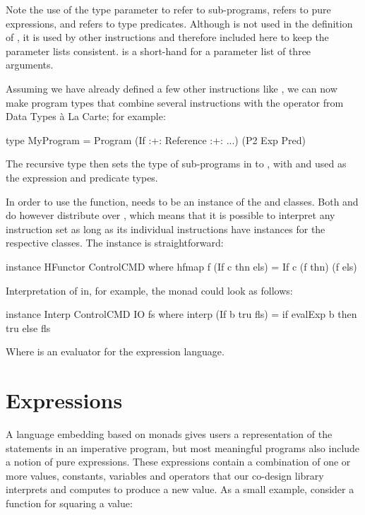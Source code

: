 \documentclass[../main.tex]{subfiles}
\begin{document}
\noindent Note the use of the type parameter  to refer to sub-programs,  refers to pure expressions, and  refers to type predicates. Although  is not used in the definition of , it is used by other instructions and therefore included here to keep the parameter lists consistent.  is a short-hand for a parameter list of three arguments.

Assuming we have already defined a few other instructions like , we can now make program types that combine several instructions with the \codei{:+:} operator from Data Types \`{a} La Carte; for example:

\begin{code}
type MyProgram = Program (If :+: Reference :+: ...) (P2 Exp Pred)
\end{code}

\noindent The recursive  type then sets the type of sub-programs in  to , with  and  used as the expression and predicate types.

In order to use the  function,  needs to be an instance of the  and  classes. Both  and  do however distribute over \codei{:+:}, which means that it is possible to interpret any instruction set as long as its individual instructions have instances for the respective classes. The  instance is straightforward:

\begin{code}
instance HFunctor ControlCMD where
  hfmap f (If c thn els) = If c (f thn) (f els)
\end{code}

\noindent Interpretation of  in, for example, the  monad could look as follows:

\begin{code}
instance Interp ControlCMD IO fs where
  interp (If b tru fls) = if evalExp b then tru else fls
\end{code}

\noindent Where  is an evaluator for the expression language.

\section{Expressions}
\label{expr}

A language embedding based on monads gives users a representation of the statements in an imperative program, but most meaningful programs also include a notion of pure expressions. These expressions contain a combination of one or more values, constants, variables and operators that our co-design library interprets and computes to produce a new value. As a small example, consider a function for squaring a value:
\end{document}
